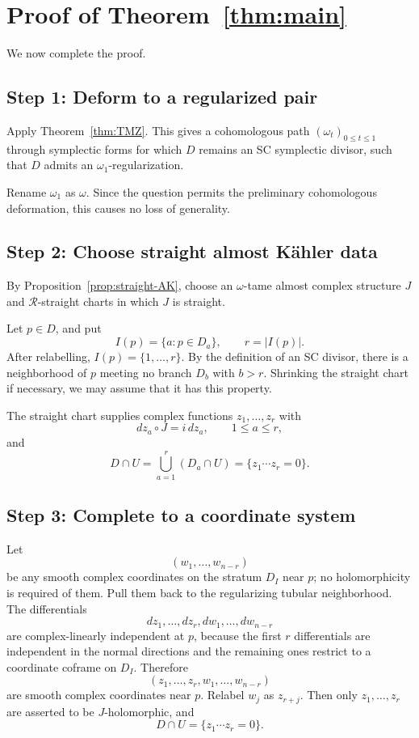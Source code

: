 \documentclass[11pt]{article}
\theoremstyle{definition}
\theoremstyle{remark}
\begin{document}
\section{Proof of Theorem~\ref{thm:main}}

We now complete the proof.

\subsection*{Step 1: Deform to a regularized pair}

Apply Theorem~\ref{thm:TMZ}. This gives a cohomologous path
\((\omega_t)_{0\leq t\leq1}\) through symplectic forms for which \(D\) remains
an SC symplectic divisor, such that \(D\) admits an \(\omega_1\)-regularization.

Rename \(\omega_1\) as \(\omega\). Since the question permits the preliminary
cohomologous deformation, this causes no loss of generality.

\subsection*{Step 2: Choose straight almost K\"ahler data}

By Proposition~\ref{prop:straight-AK}, choose an \(\omega\)-tame almost complex
structure \(J\) and \(\mathcal R\)-straight charts in which \(J\) is straight.

Let \(p\in D\), and put
\[
I(p)=\{a:p\in D_a\},\qquad r=|I(p)|.
\]
After relabelling, \(I(p)=\{1,\ldots,r\}\). By the definition of an SC divisor,
there is a neighborhood of \(p\) meeting no branch \(D_b\) with \(b>r\).
Shrinking the straight chart if necessary, we may assume that it has this
property.

The straight chart supplies complex functions \(z_1,\ldots,z_r\) with
\[
dz_a\circ J=i\,dz_a,\qquad 1\leq a\leq r,
\]
and
\[
D\cap U
 =\bigcup_{a=1}^r(D_a\cap U)
 =\{z_1\cdots z_r=0\}.
\]

\subsection*{Step 3: Complete to a coordinate system}

Let
\[
(w_1,\ldots,w_{n-r})
\]
be any smooth complex coordinates on the stratum \(D_I\) near \(p\); no
holomorphicity is required of them. Pull them back to the regularizing tubular
neighborhood. The differentials
\[
dz_1,\ldots,dz_r,dw_1,\ldots,dw_{n-r}
\]
are complex-linearly independent at \(p\), because the first \(r\) differentials
are independent in the normal directions and the remaining ones restrict to a
coordinate coframe on \(D_I\). Therefore
\[
(z_1,\ldots,z_r,w_1,\ldots,w_{n-r})
\]
are smooth complex coordinates near \(p\). Relabel \(w_j\) as \(z_{r+j}\).
Then only \(z_1,\ldots,z_r\) are asserted to be \(J\)-holomorphic, and
\[
D\cap U=\{z_1\cdots z_r=0\}.
\]
\end{document}

